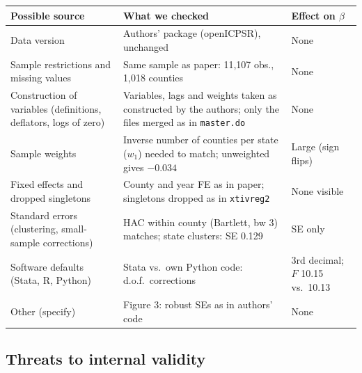\documentclass[12pt,a4paper]{article}
\renewcommand{\arraystretch}{1.25}
\begin{document}
{\renewcommand{\arraystretch}{1.4}%
\begin{tabularx}{\textwidth}{@{}>{\raggedright\arraybackslash}p{}L>{\raggedright\arraybackslash}p{0.15\textwidth}@{}}
\toprule
Possible source & What we checked & Effect on $\beta$ \\
\midrule
Data version & Authors' package (openICPSR), unchanged & None \\
Sample restrictions and missing values & Same sample as paper: 11,107 obs., 1,018 counties & None \\
Construction of variables (definitions, deflators, logs of zero) & Variables, lags and weights taken as constructed by the authors; only the files merged as in \texttt{master.do} & None \\
Sample weights & Inverse number of counties per state ($w_1$) needed to match; unweighted gives $-0.034$ & Large (sign flips) \\
Fixed effects and dropped singletons & County and year FE as in paper; singletons dropped as in \texttt{xtivreg2} & None visible \\
Standard errors (clustering, small-sample corrections) & HAC within county (Bartlett, bw 3) matches; state clusters: SE 0.129 & SE only \\
Software defaults (Stata, R, Python) & Stata vs.\ own Python code: d.o.f.\ corrections & 3rd decimal; $F$ 10.15 vs.\ 10.13 \\
Other (specify) & Figure 3: robust SEs as in authors' code & None \\
\bottomrule
\end{tabularx}}

\subsection{Threats to internal validity}
\end{document}
